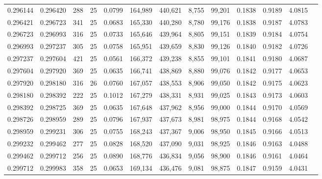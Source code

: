 \begin{tabular}{rrrrrrrrrrrrr}
0.296144 & 0.296420 &   288 &  25 &                                     0.0799 & 164,989 & 440,621 &   8,755 &  99,201 & 0.1838 & 0.9189 & 4.0815 \\
0.296421 & 0.296723 &   341 &  25 &                                     0.0683 & 165,330 & 440,280 &   8,780 &  99,176 & 0.1838 & 0.9187 & 4.0783 \\
0.296723 & 0.296993 &   316 &  25 &                                     0.0733 & 165,646 & 439,964 &   8,805 &  99,151 & 0.1839 & 0.9184 & 4.0754 \\
0.296993 & 0.297237 &   305 &  25 &                                     0.0758 & 165,951 & 439,659 &   8,830 &  99,126 & 0.1840 & 0.9182 & 4.0726 \\
0.297237 & 0.297604 &   421 &  25 &                                     0.0561 & 166,372 & 439,238 &   8,855 &  99,101 & 0.1841 & 0.9180 & 4.0687 \\
0.297604 & 0.297920 &   369 &  25 &                                     0.0635 & 166,741 & 438,869 &   8,880 &  99,076 & 0.1842 & 0.9177 & 4.0653 \\
0.297920 & 0.298180 &   316 &  26 &                                     0.0760 & 167,057 & 438,553 &   8,906 &  99,050 & 0.1842 & 0.9175 & 4.0623 \\
0.298180 & 0.298392 &   222 &  25 &                                     0.1012 & 167,279 & 438,331 &   8,931 &  99,025 & 0.1843 & 0.9173 & 4.0603 \\
0.298392 & 0.298725 &   369 &  25 &                                     0.0635 & 167,648 & 437,962 &   8,956 &  99,000 & 0.1844 & 0.9170 & 4.0569 \\
0.298726 & 0.298959 &   289 &  25 &                                     0.0796 & 167,937 & 437,673 &   8,981 &  98,975 & 0.1844 & 0.9168 & 4.0542 \\
0.298959 & 0.299231 &   306 &  25 &                                     0.0755 & 168,243 & 437,367 &   9,006 &  98,950 & 0.1845 & 0.9166 & 4.0513 \\
0.299232 & 0.299462 &   277 &  25 &                                     0.0828 & 168,520 & 437,090 &   9,031 &  98,925 & 0.1846 & 0.9163 & 4.0488 \\
0.299462 & 0.299712 &   256 &  25 &                                     0.0890 & 168,776 & 436,834 &   9,056 &  98,900 & 0.1846 & 0.9161 & 4.0464 \\
0.299712 & 0.299983 &   358 &  25 &                                     0.0653 & 169,134 & 436,476 &   9,081 &  98,875 & 0.1847 & 0.9159 & 4.0431 \\

\end{tabular}
